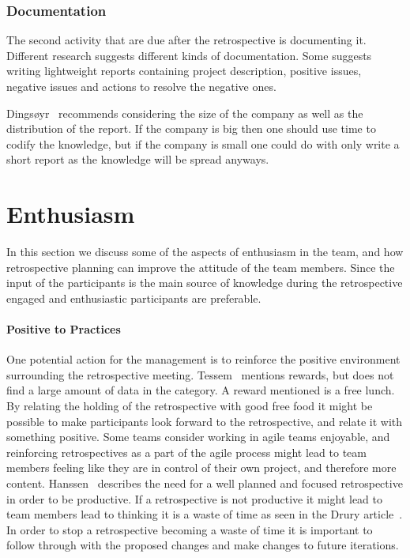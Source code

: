 \documentclass[12pt]{article}
\begin{document}
\subsubsection{Documentation}
The second activity that are due after the retrospective is documenting it. Different research suggests different kinds of documentation. Some suggests ~\cite{Collier1996} writing lightweight reports containing project description, positive issues, negative issues and actions to resolve the negative ones. 

Dingsøyr~\cite{Dingsoyr2005} recommends considering the size of the company as well as the distribution of the report. If the company is big then one should use time to codify the knowledge, but if the company is small one could do with only write a short report as the knowledge will be spread anyways. 

\section{Enthusiasm}
In this section we discuss some of the aspects of enthusiasm in the team, and how retrospective planning can improve the attitude of the team members. Since the input of the participants is the main source of knowledge during the retrospective engaged and enthusiastic participants are preferable. 

\paragraph{Positive to Practices}
One potential action for the management is to reinforce the positive environment surrounding the retrospective meeting. Tessem~\cite{Tessem2014} mentions rewards, but does not find a large amount of data in the category. A reward mentioned is a free lunch. By relating the holding of the retrospective with good free food it might be possible to make participants look forward to the retrospective, and relate it with something positive. Some teams consider working in agile teams enjoyable, and reinforcing retrospectives as a part of the agile process might lead to team members feeling like they are in control of their own project, and therefore more content. Hanssen~\cite{Hanssen2003} describes the need for a well planned and focused retrospective in order to be productive. If a retrospective is not productive it might lead to team members lead to thinking it is a waste of time as seen in the Drury article~\cite{Drury2012}. In order to stop a retrospective becoming a waste of time it is important to follow through with the proposed changes and make changes to future iterations.
\end{document}
